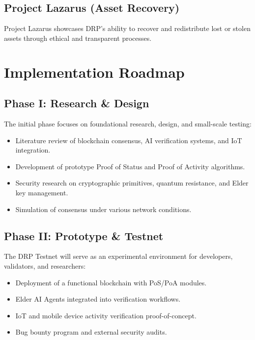 \documentclass[11pt,a4paper]{article}
\begin{document}
\subsection{Project Lazarus (Asset Recovery)}
Project Lazarus showcases DRP's ability to recover and redistribute lost or stolen assets through ethical and transparent processes.


\section{Implementation Roadmap}

\subsection{Phase I: Research \& Design}
The initial phase focuses on foundational research, design, and small-scale testing:
\begin{itemize}
    \item Literature review of blockchain consensus, AI verification systems, and IoT integration.
    \item Development of prototype Proof of Status and Proof of Activity algorithms.
    \item Security research on cryptographic primitives, quantum resistance, and Elder key management.
    \item Simulation of consensus under various network conditions.
\end{itemize}

\subsection{Phase II: Prototype \& Testnet}
The DRP Testnet will serve as an experimental environment for developers, validators, and researchers:
\begin{itemize}
    \item Deployment of a functional blockchain with PoS/PoA modules.
    \item Elder AI Agents integrated into verification workflows.
    \item IoT and mobile device activity verification proof-of-concept.
    \item Bug bounty program and external security audits.
\end{itemize}
\end{document}
